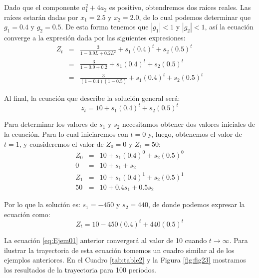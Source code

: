\documentclass[
]{book}
\begin{document}
Dado que el componente \(a^2_1 + 4 a_2\) es positivo, obtendremos dos raíces reales. Las raíces estarán dadas por \(x_1 = 2.5\) y \(x_2 = 2.0\), de lo cual podemos determinar que \(g_1 = 0.4\) y \(g_2 = 0.5\). De esta forma tenemos que \(|g_1| < 1\) y \(|g_2| < 1\), así la ecuación converge a la expresión dada por las siguientes expresiones:
\begin{eqnarray}
    Z_t & = & \frac{3}{1 - 0.9 L + 0.2 L^2} + s_1 (0.4)^t + s_2 (0.5)^t \nonumber \\
    & = & \frac{3}{1 - 0.9 + 0.2} + s_1 (0.4)^t + s_2 (0.5)^t \nonumber \\
    & = & \frac{3}{(1 - 0.4)(1 - 0.5)} + s_1 (0.4)^t + s_2 (0.5)^t \nonumber
\end{eqnarray}

Al final, la ecuación que describe la solución general será:
\begin{equation}
    z_t = 10 + s_1 (0.4)^t + s_2 (0.5)^t
    \label{eq:Conver9}
\end{equation}

Para determinar los valores de \(s_1\) y \(s_2\) necesitamos obtener dos valores iniciales de la ecuación. Para lo cual iniciaremos con \(t = 0\) y, luego, obtenemos el valor de \(t = 1\), y consideremos el valor de \(Z_0 = 0\) y \(Z_1 = 50\):
\begin{eqnarray*}
    Z_0 & = & 10 + s_1(0.4)^0  + s_2(0.5)^0 \\
    0 & = & 10 + s_1 + s_2 \\
    Z_1 & = & 10 + s_1(0.4)^1  + s_2(0.5)^1 \\
    50 & = & 10 + 0.4 s_1 + 0.5 s_2
\end{eqnarray*}

Por lo que la solución es: \(s_1 = -450\) y \(s_2 = 440\), de donde podemos expresar la ecuación como:
\begin{equation}
    Z_t = 10 - 450(0.4)^t + 440(0.5)^t
\label{eq:Ejem01}
\end{equation}

La ecuación \eqref{eq:Ejem01} anterior convergerá al valor de 10 cuando \(t \rightarrow \infty\). Para ilustrar la trayectoria de esta ecuación tomemos un cuadro similar al de los ejemplos anteriores. En el Cuadro \ref{tab:table2} y la Figura \ref{fig:fig23} mostramos los resultados de la trayectoria para 100 períodos.
\end{document}
